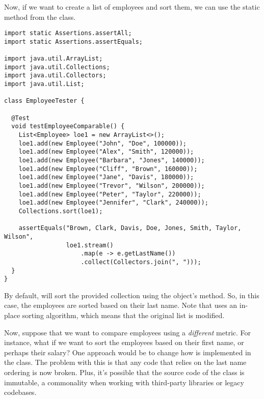 Now, if we want to create a list of employees and sort them, we can use the static  method from the  class. 

\begin{lstlisting}[language=MyJava]
import static Assertions.assertAll;
import static Assertions.assertEquals;

import java.util.ArrayList;
import java.util.Collections;
import java.util.Collectors;
import java.util.List;

class EmployeeTester {

  @Test
  void testEmployeeComparable() {
    List<Employee> loe1 = new ArrayList<>();
    loe1.add(new Employee("John", "Doe", 100000));
    loe1.add(new Employee("Alex", "Smith", 120000));
    loe1.add(new Employee("Barbara", "Jones", 140000));
    loe1.add(new Employee("Cliff", "Brown", 160000));
    loe1.add(new Employee("Jane", "Davis", 180000));
    loe1.add(new Employee("Trevor", "Wilson", 200000));
    loe1.add(new Employee("Peter", "Taylor", 220000));
    loe1.add(new Employee("Jennifer", "Clark", 240000));
    Collections.sort(loe1);

    assertEquals("Brown, Clark, Davis, Doe, Jones, Smith, Taylor, Wilson",
                 loe1.stream()
                     .map(e -> e.getLastName())
                     .collect(Collectors.join(", ")));
  }
}
\end{lstlisting}

By default,  will sort the provided collection using the object's  method. So, in this case, the employees are sorted based on their last name. Note that  uses an in-place sorting algorithm, which means that the original list is modified.

Now, suppose that we want to compare employees using a \emph{different} metric. 
For instance, what if we want to sort the employees based on their first name, or perhaps their salary? 
One approach would be to change how  is implemented in the  class. 
The problem with this is that any code that relies on the last name ordering is now broken. 
Plus, it's possible that the source code of the  class is immutable, a commonality when working with third-party libraries or legacy codebases.

